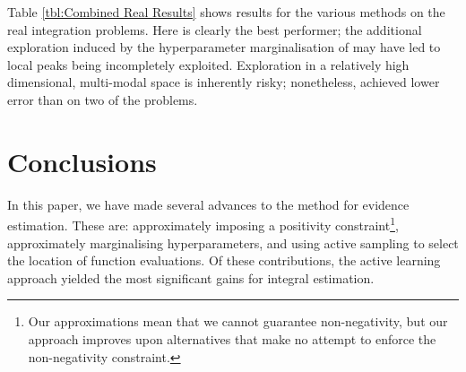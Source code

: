 \documentclass{article} %
\begin{document}
Table \ref{tbl:Combined Real Results} shows results for the various methods on the real integration problems. Here  is clearly the best performer; the additional exploration induced by the hyperparameter marginalisation of  may have led to local peaks being incompletely exploited. Exploration in a relatively high dimensional, multi-modal space is inherently risky; nonetheless,  achieved lower error than  on two of the problems.


\section{Conclusions}

 In this paper, we have made several advances to the  method for evidence estimation.  These are: approximately imposing a positivity constraint\footnote{Our approximations mean that we cannot guarantee non-negativity, but our approach improves upon alternatives that make no attempt to enforce the non-negativity constraint.}, approximately marginalising hyperparameters, and using active sampling to select the location of function evaluations. Of these contributions, the active learning approach yielded the most significant gains for integral estimation.
 
 

\end{document}
